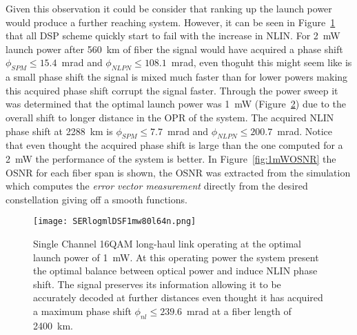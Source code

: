 \begin{figure}[h]
                                                                                                                                                                                                                                                                                                                                                                                                                                                                                                                                                                                                                                                                                                                                                                                                                                                                                                                             
 \label{fig:highP}
\end{figure}
Given this observation it could be consider that ranking up the launch power would produce a further reaching system. However, it can be seen in Figure~\ref{fig:highP} that all DSP scheme quickly start to fail with the increase in NLIN. For 2~mW launch power after 560~km of fiber the signal would have acquired a phase shift $\phi_{SPM}\le 15.4$~mrad and $\phi_{NLPN}\le 108.1$~mrad, even thoguht this might seem like is a small phase shift the signal is mixed much faster than for lower powers making this acquired phase shift corrupt the signal faster.
Through the power sweep it was determined that the optimal launch power was 1~mW (Figure~\ref{fig:1mW}) due to the overall shift to longer distance in the OPR of the system. The acquired NLIN phase shift at 2288~km is $\phi_{SPM}\le 7.7$~mrad and $\phi_{NLPN}\le 200.7$~mrad. Notice that even thought the acquired phase shift is large than the one computed for a 2~mW the performance of the system is better. In Figure~\ref{fig:1mWOSNR} the OSNR for each fiber span is shown, the OSNR was extracted from the simulation which computes the \textit{error vector measurement} directly from the desired constellation giving off a smooth functions.
  
  
  
  
\begin{figure}[h]
\centering
\texttt{[image: SERlogmlDSF1mw80l64n.png]}
\caption{Single Channel 16QAM long-haul link operating at the optimal launch power of 1~mW. At this operating power the system present the optimal balance between optical power and induce NLIN phase shift. The signal preserves its information allowing it to be accurately decoded at further distances even thought it has acquired a maximum phase shift $\phi_{nl}\le 239.6$~mrad at a fiber length of 2400~km. }
\label{fig:1mW}
\end{figure}



